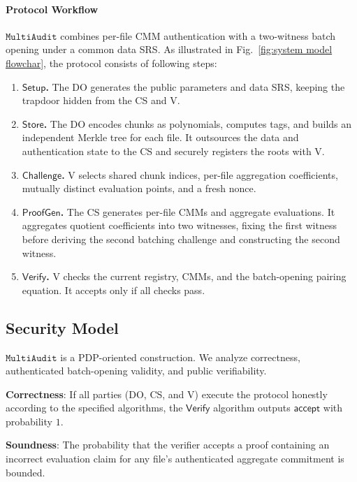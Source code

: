 \documentclass[lettersize,journal]{IEEEtran}
\newcommand{\Setup}{\ensuremath{\mathsf{Setup}}}
\newcommand{\Store}{\ensuremath{\mathsf{Store}}}
\newcommand{\Chal}{\ensuremath{\mathsf{Challenge}}}
\newcommand{\ProofGen}{\ensuremath{\mathsf{ProofGen}}}
\newcommand{\Verify}{\ensuremath{\mathsf{Verify}}}
\newcommand{\MultiAudit}{\ensuremath{\mathtt{MultiAudit}}}
\begin{document}
\paragraph{Protocol Workflow}
\MultiAudit{} combines per-file CMM authentication with a two-witness batch opening under a common data SRS. As illustrated in Fig.~\ref{fig:system model flowchar}, the protocol consists of following steps:
\begin{enumerate}
    \item \textbf{\Setup{}.} The DO generates the public parameters and data SRS, keeping the trapdoor hidden from the CS and V.
    \item \textbf{\Store{}.} The DO encodes chunks as polynomials, computes tags, and builds an independent Merkle tree for each file. It outsources the data and authentication state to the CS and securely registers the roots with V.
    \item \textbf{\Chal{}.} V selects shared chunk indices, per-file aggregation coefficients, mutually distinct evaluation points, and a fresh nonce.
    \item \textbf{\ProofGen{}.} The CS generates per-file CMMs and aggregate evaluations. It aggregates quotient coefficients into two witnesses, fixing the first witness before deriving the second batching challenge and constructing the second witness.
    \item \textbf{\Verify{}.} V checks the current registry, CMMs, and the batch-opening pairing equation. It accepts only if all checks pass.
\end{enumerate}



\subsection{Security Model}
\label{sec:security_model}
\MultiAudit{} is a PDP-oriented construction. We analyze correctness, authenticated batch-opening validity, and public verifiability.

\textbf{Correctness}: If all parties (DO, CS, and V) execute the protocol honestly according to the specified algorithms, the $\Verify$ algorithm outputs $\mathsf{accept}$ with probability $1$.

\textbf{Soundness}: The probability that the verifier accepts a proof containing an incorrect evaluation claim for any file's authenticated aggregate commitment is bounded.
\end{document}
